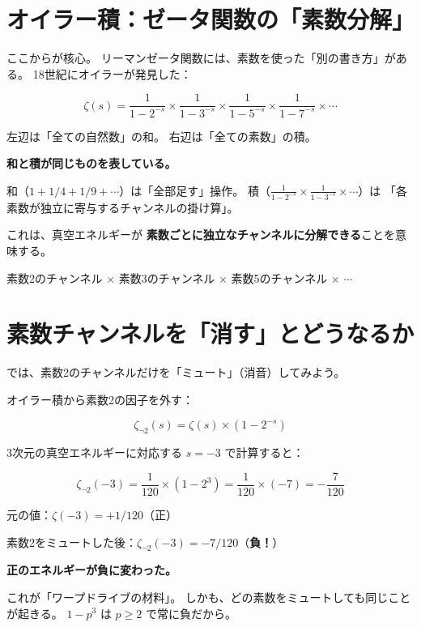\documentclass[12pt,a4paper]{article}
\begin{document}
\section{オイラー積：ゼータ関数の「素数分解」}

ここからが核心。
リーマンゼータ関数には、素数を使った「別の書き方」がある。
18世紀にオイラーが発見した：

\begin{mathbox}[オイラー積]
$$\zeta(s) = \frac{1}{1-2^{-s}} \times \frac{1}{1-3^{-s}} \times \frac{1}{1-5^{-s}} \times \frac{1}{1-7^{-s}} \times \cdots$$

左辺は「全ての自然数」の和。
右辺は「全ての素数」の積。

\textbf{和と積が同じものを表している。}
\end{mathbox}

\begin{storybox}
和（$1 + 1/4 + 1/9 + \cdots$）は「全部足す」操作。
積（$\frac{1}{1-2^{-s}} \times \frac{1}{1-3^{-s}} \times \cdots$）は
「各素数が独立に寄与するチャンネルの掛け算」。

これは、真空エネルギーが
\textbf{素数ごとに独立なチャンネルに分解できる}ことを意味する。

素数2のチャンネル × 素数3のチャンネル × 素数5のチャンネル × $\cdots$
\end{storybox}

\section{素数チャンネルを「消す」とどうなるか}

では、素数2のチャンネルだけを「ミュート」（消音）してみよう。

オイラー積から素数2の因子を外す：

$$\zeta_{\neg 2}(s) = \zeta(s) \times (1 - 2^{-s})$$

3次元の真空エネルギーに対応する $s = -3$ で計算すると：

$$\zeta_{\neg 2}(-3) = \frac{1}{120} \times (1 - 2^3) = \frac{1}{120} \times (-7) = -\frac{7}{120}$$

\begin{storybox}[符号が反転した！]
元の値：$\zeta(-3) = +1/120$（正）

素数2をミュートした後：$\zeta_{\neg 2}(-3) = -7/120$（\textbf{負！}）

\textbf{正のエネルギーが負に変わった。}

これが「ワープドライブの材料」。
しかも、どの素数をミュートしても同じことが起きる。
$1 - p^3$ は $p \geq 2$ で常に負だから。
\end{storybox}
\end{document}
